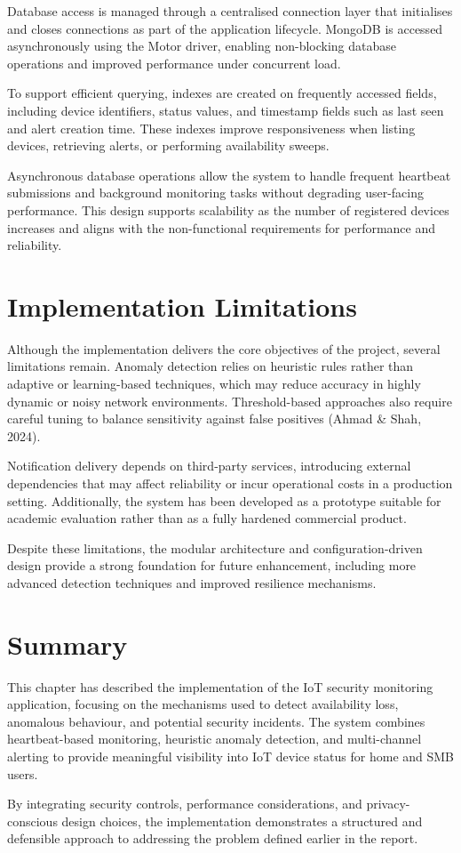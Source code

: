 Database access is managed through a centralised connection layer that initialises and closes connections as part of the application lifecycle. MongoDB is accessed asynchronously using the Motor driver, enabling non-blocking database operations and improved performance under concurrent load.

To support efficient querying, indexes are created on frequently accessed fields, including device identifiers, status values, and timestamp fields such as last seen and alert creation time. These indexes improve responsiveness when listing devices, retrieving alerts, or performing availability sweeps.

Asynchronous database operations allow the system to handle frequent heartbeat submissions and background monitoring tasks without degrading user-facing performance. This design supports scalability as the number of registered devices increases and aligns with the non-functional requirements for performance and reliability.

\section{Implementation Limitations}

Although the implementation delivers the core objectives of the project, several limitations remain. Anomaly detection relies on heuristic rules rather than adaptive or learning-based techniques, which may reduce accuracy in highly dynamic or noisy network environments. Threshold-based approaches also require careful tuning to balance sensitivity against false positives (Ahmad \& Shah, 2024).

Notification delivery depends on third-party services, introducing external dependencies that may affect reliability or incur operational costs in a production setting. Additionally, the system has been developed as a prototype suitable for academic evaluation rather than as a fully hardened commercial product.

Despite these limitations, the modular architecture and configuration-driven design provide a strong foundation for future enhancement, including more advanced detection techniques and improved resilience mechanisms.

\section{Summary}

This chapter has described the implementation of the IoT security monitoring application, focusing on the mechanisms used to detect availability loss, anomalous behaviour, and potential security incidents. The system combines heartbeat-based monitoring, heuristic anomaly detection, and multi-channel alerting to provide meaningful visibility into IoT device status for home and SMB users.

By integrating security controls, performance considerations, and privacy-conscious design choices, the implementation demonstrates a structured and defensible approach to addressing the problem defined earlier in the report.
